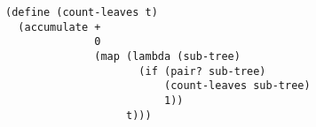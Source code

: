 \documentclass[a4paper,12pt]{article}
\begin{document}
\begin{lstlisting}
(define (count-leaves t)
  (accumulate +
              0
              (map (lambda (sub-tree)
                     (if (pair? sub-tree)
                         (count-leaves sub-tree)
                         1))
                   t)))
\end{lstlisting}
\end{document}
